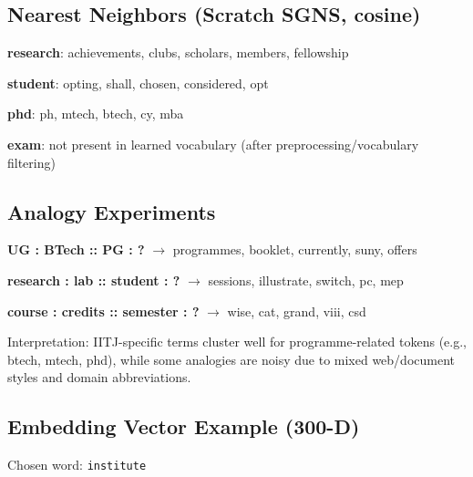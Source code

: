 \documentclass[11pt,a4paper]{article}
\begin{document}
\subsection{Nearest Neighbors (Scratch SGNS, cosine)}
\textbf{research}: achievements, clubs, scholars, members, fellowship

\textbf{student}: opting, shall, chosen, considered, opt

\textbf{phd}: ph, mtech, btech, cy, mba

\textbf{exam}: not present in learned vocabulary (after preprocessing/vocabulary filtering)

\subsection{Analogy Experiments}
\textbf{UG : BTech :: PG : ?} $\rightarrow$ programmes, booklet, currently, suny, offers

\textbf{research : lab :: student : ?} $\rightarrow$ sessions, illustrate, switch, pc, mep

\textbf{course : credits :: semester : ?} $\rightarrow$ wise, cat, grand, viii, csd

Interpretation: IITJ-specific terms cluster well for programme-related tokens (e.g., btech, mtech, phd), while some analogies are noisy due to mixed web/document styles and domain abbreviations.

\subsection{Embedding Vector Example (300-D)}
Chosen word: \texttt{institute}
\end{document}
